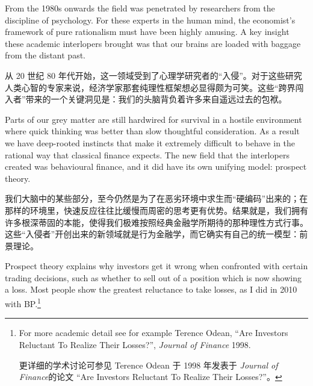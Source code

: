 \bipairgap

\begin{englishblock} From the 1980s onwards the field was penetrated by researchers from the discipline of psychology. For these experts in the human mind, the economist's framework of pure rationalism must have been highly amusing. A key insight these academic interlopers brought was that our brains are loaded with baggage from the distant past. \end{englishblock}

\begin{chineseblock}从 20 世纪 80 年代开始，这一领域受到了心理学研究者的“入侵”。对于这些研究人类心智的专家来说，经济学家那套纯理性框架想必显得颇为可笑。这些“跨界闯入者”带来的一个关键洞见是：我们的头脑背负着许多来自遥远过去的包袱。\end{chineseblock}

\bipairgap

\begin{englishblock} Parts of our grey matter are still hardwired for survival in a hostile environment where quick thinking was better than slow thoughtful consideration. As a result we have deep-rooted instincts that make it extremely difficult to behave in the rational way that classical finance expects. The new field that the interlopers created was behavioural finance, and it did have its own unifying model: prospect theory. \end{englishblock}

\begin{chineseblock}我们大脑中的某些部分，至今仍然是为了在恶劣环境中求生而“硬编码”出来的；在那样的环境里，快速反应往往比缓慢而周密的思考更有优势。结果就是，我们拥有许多根深蒂固的本能，使得我们极难按照经典金融学所期待的那种理性方式行事。这些“入侵者”开创出来的新领域就是行为金融学，而它确实有自己的统一模型：前景理论。\end{chineseblock}


\begin{englishblock} Prospect theory explains why investors get it wrong when confronted with certain trading decisions, such as whether to sell out of a position which is now showing a loss. Most people show the greatest reluctance to take losses, as I did in 2010 with BP.\footnote{For more academic detail see for example Terence Odean, ``Are Investors Reluctant To Realize Their Losses?'', \textit{Journal of Finance} 1998. \par 更详细的学术讨论可参见 Terence Odean 于 1998 年发表于 \textit{Journal of Finance}的论文 “Are Investors Reluctant To Realize Their Losses?”。} \end{englishblock}

